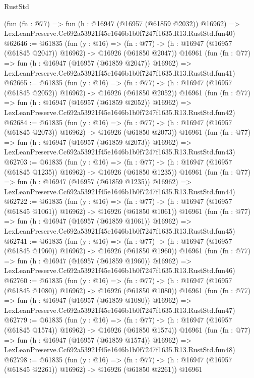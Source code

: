 \begin{lexlean}{RustStd}
\begin{coremodule}
    (fun (fn : @77) =>
    fun (h : @16947 (@16957 (@61859 @2032)) @16962) =>
    LexLeanPreserve.Cc692a53921f45e1646b1b0f7247f1635.R13.RustStd.fun40)
@62646 := @61835
    (fun (y : @16) =>
    (fn : @77) -> (h : @16947 (@16957 (@61845 @2047)) @16962) -> @16926 (@61850 @2047))
    @16961
    (fun (fn : @77) =>
    fun (h : @16947 (@16957 (@61859 @2047)) @16962) =>
    LexLeanPreserve.Cc692a53921f45e1646b1b0f7247f1635.R13.RustStd.fun41)
@62665 := @61835
    (fun (y : @16) =>
    (fn : @77) -> (h : @16947 (@16957 (@61845 @2052)) @16962) -> @16926 (@61850 @2052))
    @16961
    (fun (fn : @77) =>
    fun (h : @16947 (@16957 (@61859 @2052)) @16962) =>
    LexLeanPreserve.Cc692a53921f45e1646b1b0f7247f1635.R13.RustStd.fun42)
@62684 := @61835
    (fun (y : @16) =>
    (fn : @77) -> (h : @16947 (@16957 (@61845 @2073)) @16962) -> @16926 (@61850 @2073))
    @16961
    (fun (fn : @77) =>
    fun (h : @16947 (@16957 (@61859 @2073)) @16962) =>
    LexLeanPreserve.Cc692a53921f45e1646b1b0f7247f1635.R13.RustStd.fun43)
@62703 := @61835
    (fun (y : @16) =>
    (fn : @77) -> (h : @16947 (@16957 (@61845 @1235)) @16962) -> @16926 (@61850 @1235))
    @16961
    (fun (fn : @77) =>
    fun (h : @16947 (@16957 (@61859 @1235)) @16962) =>
    LexLeanPreserve.Cc692a53921f45e1646b1b0f7247f1635.R13.RustStd.fun44)
@62722 := @61835
    (fun (y : @16) =>
    (fn : @77) -> (h : @16947 (@16957 (@61845 @1061)) @16962) -> @16926 (@61850 @1061))
    @16961
    (fun (fn : @77) =>
    fun (h : @16947 (@16957 (@61859 @1061)) @16962) =>
    LexLeanPreserve.Cc692a53921f45e1646b1b0f7247f1635.R13.RustStd.fun45)
@62741 := @61835
    (fun (y : @16) =>
    (fn : @77) -> (h : @16947 (@16957 (@61845 @1960)) @16962) -> @16926 (@61850 @1960))
    @16961
    (fun (fn : @77) =>
    fun (h : @16947 (@16957 (@61859 @1960)) @16962) =>
    LexLeanPreserve.Cc692a53921f45e1646b1b0f7247f1635.R13.RustStd.fun46)
@62760 := @61835
    (fun (y : @16) =>
    (fn : @77) -> (h : @16947 (@16957 (@61845 @1080)) @16962) -> @16926 (@61850 @1080))
    @16961
    (fun (fn : @77) =>
    fun (h : @16947 (@16957 (@61859 @1080)) @16962) =>
    LexLeanPreserve.Cc692a53921f45e1646b1b0f7247f1635.R13.RustStd.fun47)
@62779 := @61835
    (fun (y : @16) =>
    (fn : @77) -> (h : @16947 (@16957 (@61845 @1574)) @16962) -> @16926 (@61850 @1574))
    @16961
    (fun (fn : @77) =>
    fun (h : @16947 (@16957 (@61859 @1574)) @16962) =>
    LexLeanPreserve.Cc692a53921f45e1646b1b0f7247f1635.R13.RustStd.fun48)
@62798 := @61835
    (fun (y : @16) =>
    (fn : @77) -> (h : @16947 (@16957 (@61845 @2261)) @16962) -> @16926 (@61850 @2261))
    @16961

\end{coremodule}
\end{lexlean}
